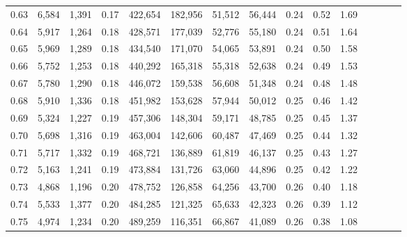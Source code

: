 \begin{tabular}{rrrcrrrrrrrrrrr}
0.63 &   6,584 &   1,391 &                                       0.17 &  422,654 &  182,956 &   51,512 &   56,444 &  0.24 &  0.52 &                         1.69 \\
0.64 &   5,917 &   1,264 &                                       0.18 &  428,571 &  177,039 &   52,776 &   55,180 &  0.24 &  0.51 &                         1.64 \\
0.65 &   5,969 &   1,289 &                                       0.18 &  434,540 &  171,070 &   54,065 &   53,891 &  0.24 &  0.50 &                         1.58 \\
0.66 &   5,752 &   1,253 &                                       0.18 &  440,292 &  165,318 &   55,318 &   52,638 &  0.24 &  0.49 &                         1.53 \\
0.67 &   5,780 &   1,290 &                                       0.18 &  446,072 &  159,538 &   56,608 &   51,348 &  0.24 &  0.48 &                         1.48 \\
0.68 &   5,910 &   1,336 &                                       0.18 &  451,982 &  153,628 &   57,944 &   50,012 &  0.25 &  0.46 &                         1.42 \\
0.69 &   5,324 &   1,227 &                                       0.19 &  457,306 &  148,304 &   59,171 &   48,785 &  0.25 &  0.45 &                         1.37 \\
0.70 &   5,698 &   1,316 &                                       0.19 &  463,004 &  142,606 &   60,487 &   47,469 &  0.25 &  0.44 &                         1.32 \\
0.71 &   5,717 &   1,332 &                                       0.19 &  468,721 &  136,889 &   61,819 &   46,137 &  0.25 &  0.43 &                         1.27 \\
0.72 &   5,163 &   1,241 &                                       0.19 &  473,884 &  131,726 &   63,060 &   44,896 &  0.25 &  0.42 &                         1.22 \\
0.73 &   4,868 &   1,196 &                                       0.20 &  478,752 &  126,858 &   64,256 &   43,700 &  0.26 &  0.40 &                         1.18 \\
0.74 &   5,533 &   1,377 &                                       0.20 &  484,285 &  121,325 &   65,633 &   42,323 &  0.26 &  0.39 &                         1.12 \\
0.75 &   4,974 &   1,234 &                                       0.20 &  489,259 &  116,351 &   66,867 &   41,089 &  0.26 &  0.38 &                         1.08 \\

\end{tabular}
